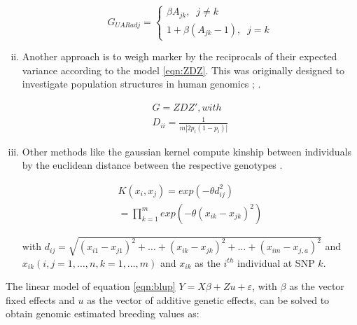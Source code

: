 \begin{enumerate}[(i)]
\begin{equation}
 G_{UARadj} = \left\{
  \!\begin{aligned}
   \beta A_{jk}, \;\; j \ne k \\
   1 + \beta (A_{jk}-1 ), \;\; j = k   
  \end{aligned}
  \right.
 \label{eqn:uaradj}
\end{equation}

\item Another approach is to weigh marker by the reciprocals of their expected variance
  according to the model \ref{eqn:ZDZ}. This was originally designed to investigate
  population structures in human genomics \cite{leutenegger2003estimation};
  \cite{amin2007genomic}.

\begin{equation}
 \!\begin{aligned}
  G = ZDZ' , with \\
  D_{ii} = \frac{1}{m | 2p_i(1-p_i) | }
 \end{aligned}
 \label{eqn:ZDZ}
\end{equation}

\item Other methods like the gaussian kernel compute kinship between individuals by the euclidean distance
between the respective genotypes \cite{morota2014kernel}.

\begin{equation}
 \!\begin{aligned}
  K(x_i,x_j) = exp (- \theta d_{ij}^2) \\
  = \prod_{k=1}^m exp (- \theta(x_{ik} - x_{jk})^2)
 \end{aligned}
 \label{eqn:gauss}
\end{equation}

with
$d_{ij} = \sqrt{(x_{i1} - x_{j1})^2 + \dots + (x_{ik} - x_{jk})^2 + \dots + (x_{im} - x_{j,a})^2 }$
and
$ x_{ik}(i,j = 1, \dots , n,k = 1, \dots , m)$ and $x_{ik}$ as the $i^{th}$ individual at SNP $k$. \\
\end{enumerate}

The linear model of equation \ref{eqn:blup} $Y = X \beta + Zu + \varepsilon$, with $\beta$
as the vector fixed effects and $u$ as the vector of additive genetic effects, can be
solved to obtain genomic estimated breeding values as:

